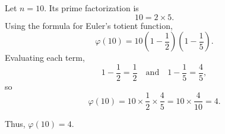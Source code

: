 \documentclass[12pt]{article}
\title{}
\author{Jerich Lee}
\date{\today}
\theoremstyle{definition} %
\theoremstyle{plain} %
\begin{document}
\maketitle

Let \( n = 10 \). Its prime factorization is
\[
10 = 2 \times 5.
\]
Using the formula for Euler's totient function,
\[
\varphi(10) = 10 \left(1 - \frac{1}{2}\right)\left(1 - \frac{1}{5}\right).
\]
Evaluating each term,
\[
1 - \frac{1}{2} = \frac{1}{2} \quad \text{and} \quad 1 - \frac{1}{5} = \frac{4}{5},
\]
so
\[
\varphi(10) = 10 \times \frac{1}{2} \times \frac{4}{5} = 10 \times \frac{4}{10} = 4.
\]

Thus, \(\varphi(10) = 4\).
\end{document}
